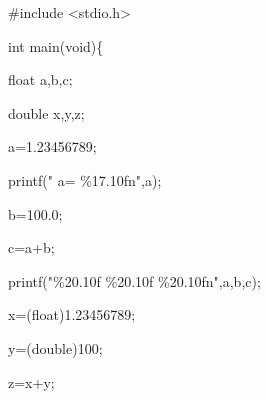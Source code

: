 \documentclass{article}
\begin{document}
\begin{maplegroup}
\begin{Maple Normal}{
\#include <stdio.h>}\end{Maple Normal}

\begin{Maple Normal}{
}\end{Maple Normal}
\begin{Maple Normal}{
int main(void)\{}\end{Maple Normal}

\begin{Maple Normal}{
float a,b,c;}\end{Maple Normal}

\begin{Maple Normal}{
double x,y,z;}\end{Maple Normal}

\begin{Maple Normal}{
}\end{Maple Normal}
\begin{Maple Normal}{
a=1.23456789;}\end{Maple Normal}

\begin{Maple Normal}{
printf("  a= \%17.10fn",a);}\end{Maple Normal}

\begin{Maple Normal}{
}\end{Maple Normal}
\begin{Maple Normal}{
b=100.0;}\end{Maple Normal}

\begin{Maple Normal}{
c=a+b;}\end{Maple Normal}

\begin{Maple Normal}{
printf("\%20.10f \%20.10f \%20.10fn",a,b,c);}\end{Maple Normal}

\begin{Maple Normal}{
}\end{Maple Normal}
\begin{Maple Normal}{
x=(float)1.23456789;}\end{Maple Normal}

\begin{Maple Normal}{
y=(double)100;}\end{Maple Normal}

\begin{Maple Normal}{
z=x+y;}\end{Maple Normal}


\end{maplegroup}
\end{document}
